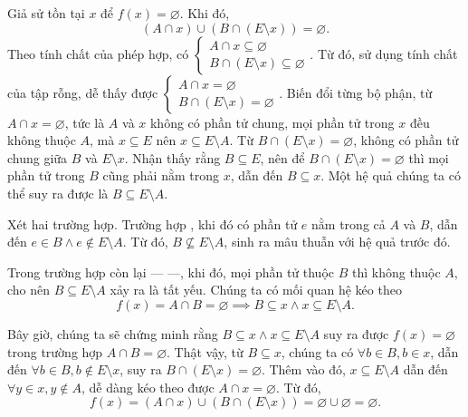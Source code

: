 Giả sử tồn tại $x$ để $f(x) = \varnothing$. Khi đó, 
\begin{equation*}
   (A \cap x) \cup (B \cap (E \setminus x)) = \varnothing.
\end{equation*}
Theo tính chất của phép hợp, có $\begin{cases}
   A \cap x \subseteq \varnothing \\
   B \cap (E \setminus x) \subseteq \varnothing
\end{cases}$. Từ đó, sử dụng tính chất của tập rỗng, dễ thấy được $\begin{cases}
   A \cap x = \varnothing \\
   B \cap (E \setminus x) = \varnothing
\end{cases}$. Biến đổi từng bộ phận, từ $A \cap x = \varnothing$, tức là $A$ và $x$ không có phần tử chung, mọi phần tử trong $x$ đều không thuộc $A$, mà $x \subseteq E$ nên $x \subseteq E \setminus A$. Từ $B \cap (E \setminus x) = \varnothing$, không có phần tử chung giữa $B$ và $E \setminus x$. Nhận thấy rằng $B \subseteq E$, nên để $B \cap (E \setminus x) = \varnothing$ thì mọi phần tử trong $B$ cũng phải nằm trong $x$, dẫn đến $B \subseteq x$. Một hệ quả chúng ta có thể suy ra được là $B \subseteq E \setminus A$. 

Xét hai trường hợp. Trường hợp , khi đó có phần tử $e$ nằm trong cả $A$ và $B$, dẫn đến $e \in B \land e \notin E \setminus A$. Từ đó, $B \nsubseteq E \setminus A$, sinh ra mâu thuẫn với hệ quả trước đó.

Trong trường hợp còn lại ---  ---, khi đó, mọi phần tử thuộc $B$ thì không thuộc $A$, cho nên $B \subseteq E \setminus A$ xảy ra là tất yếu. Chúng ta có mối quan hệ kéo theo \begin{equation*}
   f(x) = A \cap B = \varnothing \implies B \subseteq x \land x \subseteq E \setminus A.
\end{equation*}

Bây giờ, chúng ta sẽ chứng minh rằng $B \subseteq x \land x \subseteq E \setminus A$ suy ra được $f(x) = \varnothing$ trong trường hợp $A \cap B = \varnothing$. Thật vậy, từ $B \subseteq x$, chúng ta có $\forall b \in B, b \in x$, dẫn đến $\forall b \in B, b \notin E \setminus x$, suy ra $B \cap (E \setminus x) = \varnothing$. Thêm vào đó, $x \subseteq E \setminus A$ dẫn đến $\forall y \in x, y \notin A$, dễ dàng kéo theo được $A \cap x = \varnothing$. Từ đó,
\begin{equation*}
   f(x) = (A \cap x) \cup (B \cap (E \setminus x)) = \varnothing \cup \varnothing = \varnothing.
\end{equation*}


